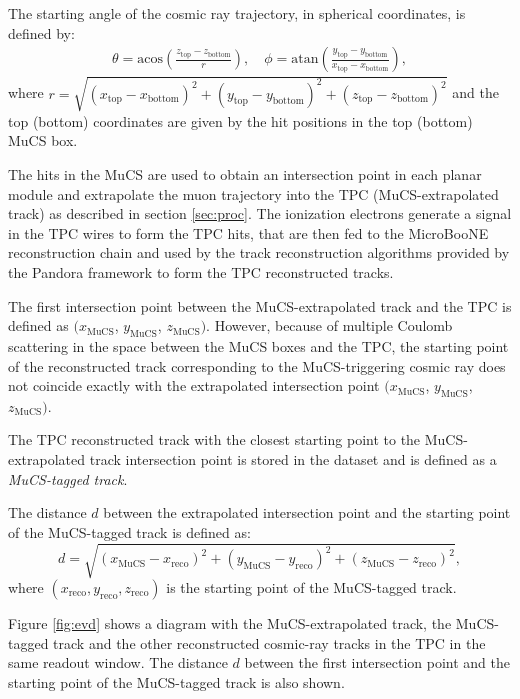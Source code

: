 \documentclass[a4paper,11pt]{article}
\begin{document}
The starting angle of the cosmic ray trajectory, in spherical coordinates, is defined by:
\begin{align}\label{eq:angles_mucs}
  \theta = \mathrm{acos}\left(\frac{z_{\mathrm{top}}-z_{\mathrm{bottom}}}{r}\right), \quad
  \phi = \mathrm{atan}\left(\frac{y_{\mathrm{top}}-y_{\mathrm{bottom}}}{x_{\mathrm{top}}-x_{\mathrm{bottom}}}\right),
\end{align}
where $r = \sqrt{(x_{\mathrm{top}}-x_{\mathrm{bottom}})^2+(y_{\mathrm{top}}-y_{\mathrm{bottom}})^2+(z_{\mathrm{top}}-z_{\mathrm{bottom}})^2}$ and the top (bottom) coordinates are given by the hit positions in the top (bottom) MuCS box.

The hits in the MuCS are used to obtain an intersection point in each planar module and extrapolate the muon trajectory into the TPC (MuCS-extrapolated track) as described in section \ref{sec:proc}. The ionization electrons generate a signal in the TPC wires to form the TPC hits, that are then fed to the MicroBooNE reconstruction chain and used by the track reconstruction algorithms provided by the Pandora framework \cite{pandora} to form the TPC reconstructed tracks.

The first intersection point between the MuCS-extrapolated track and the TPC is defined as $(x_{\mathrm{MuCS}}$, $y_{\mathrm{MuCS}}$, $z_{\mathrm{MuCS}})$. However, because of multiple Coulomb scattering in the space between the MuCS boxes and the TPC, the starting point of the reconstructed track corresponding to the MuCS-triggering cosmic ray does not coincide exactly with the extrapolated intersection point $(x_{\mathrm{MuCS}}$, $y_{\mathrm{MuCS}}$, $z_{\mathrm{MuCS}})$.

The TPC reconstructed track with the closest starting point to the MuCS-extrapolated track intersection point is stored in the dataset and is defined as a \emph{MuCS-tagged track}.

The distance $d$ between the extrapolated intersection point and the starting point of the MuCS-tagged track is defined as:
\begin{equation}\label{eq:d}
d = \sqrt{(x_{\mathrm{MuCS}}-x_{\mathrm{reco}})^2+(y_{\mathrm{MuCS}}-y_{\mathrm{reco}})^2+(z_{\mathrm{MuCS}}-z_{\mathrm{reco}})^2},
\end{equation}
where $(x_{\mathrm{reco}},y_{\mathrm{reco}},z_{\mathrm{reco}})$ is the starting point of the MuCS-tagged track.

Figure \ref{fig:evd} shows a diagram with the MuCS-extrapolated track, the MuCS-tagged track and the other reconstructed cosmic-ray tracks in the TPC in the same readout window. The distance $d$ between the first intersection point and the starting point of the MuCS-tagged track is also shown.
\end{document}
